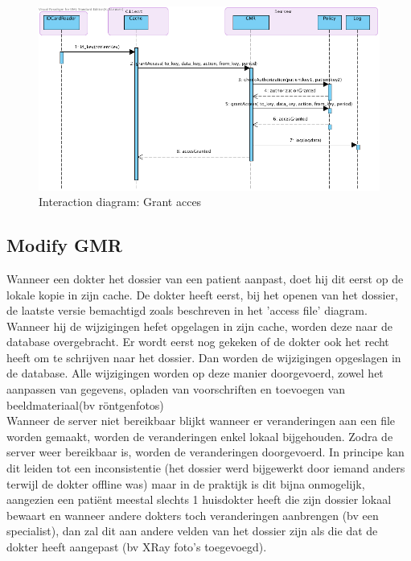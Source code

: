 \documentclass[a4paper,10pt]{article}
\begin{document}
\begin{figure}[!h]
  \includegraphics[width=\textwidth]{../images/grantAccess.png}
  \caption{Interaction diagram: Grant acces}
\end{figure}

\subsection{Modify GMR}
Wanneer een dokter het dossier van een patient aanpast, doet hij dit eerst op de lokale kopie in zijn cache. De dokter heeft eerst, bij het openen van het dossier, de laatste versie bemachtigd zoals beschreven in het 'access file' diagram. Wanneer hij de wijzigingen hefet opgelagen in zijn cache, worden deze naar de database overgebracht. Er wordt eerst nog gekeken of de dokter ook het recht heeft om te schrijven naar het dossier. Dan worden de wijzigingen opgeslagen in de database. Alle wijzigingen worden op deze manier doorgevoerd, zowel het aanpassen van gegevens, opladen van voorschriften en toevoegen van beeldmateriaal(bv röntgenfotos)\\
Wanneer de server niet bereikbaar blijkt wanneer er veranderingen aan een file worden gemaakt, worden de veranderingen enkel lokaal bijgehouden. Zodra de server weer bereikbaar is, worden de veranderingen doorgevoerd. In principe kan dit leiden tot een inconsistentie (het dossier werd bijgewerkt door iemand anders terwijl de dokter offline was) maar in de praktijk is dit bijna onmogelijk, aangezien een patiënt meestal slechts 1 huisdokter heeft die zijn dossier lokaal bewaart en wanneer andere dokters toch veranderingen aanbrengen (bv een specialist), dan zal dit aan andere velden van het dossier zijn als die dat de dokter heeft aangepast (bv XRay foto's toegevoegd). 
\end{document}
